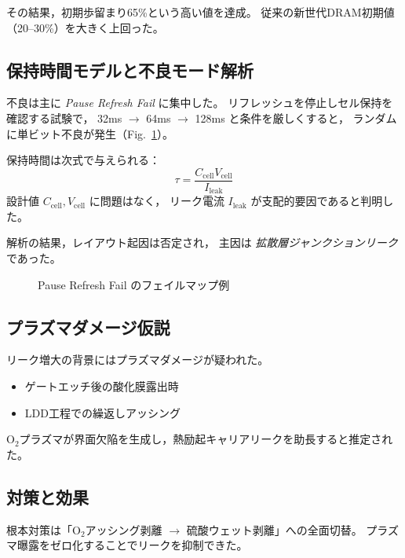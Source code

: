 \documentclass[conference]{IEEEtran}
\begin{document}
その結果，初期歩留まり65\%という高い値を達成。
従来の新世代DRAM初期値（20--30\%）を大きく上回った。

\subsection{保持時間モデルと不良モード解析}
不良は主に \emph{Pause Refresh Fail} に集中した。
リフレッシュを停止しセル保持を確認する試験で，
32ms $\rightarrow$ 64ms $\rightarrow$ 128ms と条件を厳しくすると，
ランダムに単ビット不良が発生（Fig.~\ref{fig:failmap}）。

保持時間は次式で与えられる：
\[
\tau = \frac{C_{\mathrm{cell}} V_{\mathrm{cell}}}{I_{\mathrm{leak}}}
\]
設計値 $C_{\mathrm{cell}}, V_{\mathrm{cell}}$ に問題はなく，
リーク電流 $I_{\mathrm{leak}}$ が支配的要因であると判明した。

解析の結果，レイアウト起因は否定され，
主因は \emph{拡散層ジャンクションリーク} であった。

\begin{figure}[t]
\centering
{}
\caption{Pause Refresh Fail のフェイルマップ例}
\label{fig:failmap}
\end{figure}

\subsection{プラズマダメージ仮説}
リーク増大の背景にはプラズマダメージが疑われた。
\begin{itemize}
  \item ゲートエッチ後の酸化膜露出時
  \item LDD工程での繰返しアッシング
\end{itemize}
O$_2$プラズマが界面欠陥を生成し，熱励起キャリアリークを助長すると推定された。

\subsection{対策と効果}
根本対策は「O$_2$アッシング剥離 $\rightarrow$ 硫酸ウェット剥離」への全面切替。
プラズマ曝露をゼロ化することでリークを抑制できた。
\end{document}
